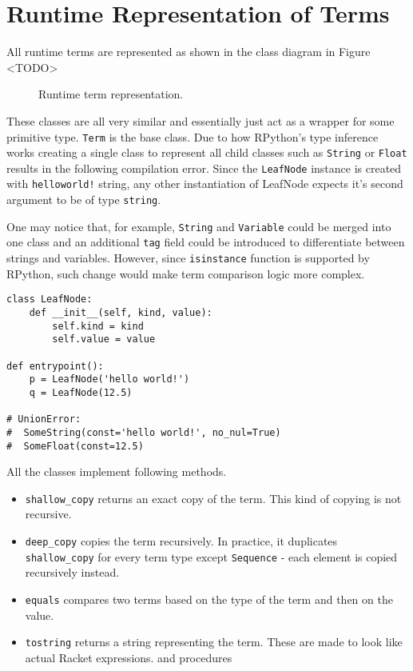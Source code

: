 \section{Runtime Representation of Terms}

All runtime terms are represented as shown in the class diagram in Figure <TODO>

\begin{figure}[H]
	\centering
\caption{Runtime term representation.}
\label{class-diagram-runtime-term}
\end{figure}

These classes are all very similar and essentially just act as a wrapper for some primitive type. \texttt{Term} is the base class. Due to how RPython's type inference works creating a single class to represent all child classes such as \texttt{String} or \texttt{Float} results in the following compilation error.  Since the \texttt{LeafNode} instance is created with \texttt{helloworld!} string, any other instantiation of LeafNode expects it's second argument to be of type \texttt{string}. 

One may notice that, for example, \texttt{String} and \texttt{Variable} could be merged into one class and an additional \texttt{tag} field could be introduced to differentiate between strings and variables. However, since \texttt{isinstance} function is supported by RPython, such change would make term comparison logic more complex.

\begin{verbatim}
class LeafNode:
    def __init__(self, kind, value):
        self.kind = kind 
        self.value = value

def entrypoint():
    p = LeafNode('hello world!')
    q = LeafNode(12.5)

# UnionError:
#  SomeString(const='hello world!', no_nul=True)
#  SomeFloat(const=12.5)
\end{verbatim}

All the classes implement following methods.
\begin{itemize}
\item \texttt{shallow\_copy} returns an exact copy of the term. This kind of copying is not recursive.
\item
\texttt{deep\_copy} copies the term recursively. In practice, it duplicates \texttt{shallow\_copy} for every term type except \texttt{Sequence} - each element is copied recursively instead.
\item
\texttt{equals} compares two terms based on the type of the term and then on the value.
\item
\texttt{tostring} returns a string representing the term. These are made to look like actual Racket expressions.
and procedures
\end{itemize}
 

